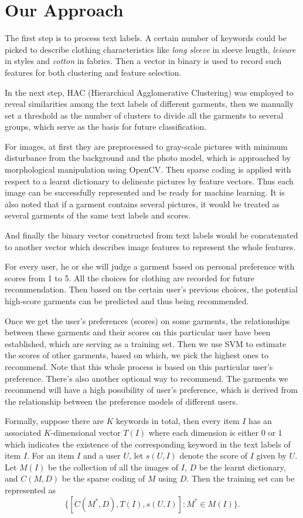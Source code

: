 \section{Our Approach}\label{sec:approach}

The first step is to process text labels. A certain number of keywords 
  could be picked to describe clothing characteristics like 
  \emph{long sleeve} in sleeve length, 
  \emph{leisure} in styles and 
  \emph{cotton} in fabrics. 
Then a vector in binary is used to record such features for both clustering and feature selection.

In the next step, HAC (Hierarchical Agglomerative Clustering) was 
employed to reveal similarities among the text labels of different 
garments, then we manually set a threshold as the number of clusters to divide all the garments to several groups, which serve as the basis for future classification.

For images, at first they are preprocessed to gray-scale 
  pictures with minimum disturbance from the background 
  and the photo model, which is approached by morphological 
  manipulation using OpenCV. 
Then sparse coding is applied with respect to a learnt dictionary  
  to delineate pictures by feature vectors. 
Thus each image can be successfully represented and be ready for machine learning. 
It is also noted that if a garment contains several pictures, 
  it would be treated as several garments of the same text labels and scores.

And finally the binary vector constructed from text labels would be concatenated to another vector which describes image features to represent the whole features.

For every user, he or she will judge a garment based on personal 
  preference with scores from 1 to 5. 
All the choices for clothing are recorded for future recommendation. 
Then based on the certain user's previous choices, the potential 
  high-score garments can be predicted and thus being recommended.

Once we get the user's preferences (scores) on some garments, 
  the relationships between these garments and their scores on this
  particular user have been established, which are serving as a training set. 
Then we use SVM to estimate the scores of other garments, based on which, 
  we pick the highest ones to recommend. 
Note that this whole process is based on this particular user's preference.
There's also another optional way to recommend. 
The garments we recommend will have a high possibility of user's preference, 
  which is derived from the relationship between the preference models of different users.

Formally, suppose there are $K$ keywords in total, then every item $I$ has an associated 
  $K$-dimensional vector $T(I)$ where each dimension is either 0 or 1 which indicates the 
  existence of the corresponding keyword in the text labels of item $I$.
For an item $I$ and a user $U$, let $s(U,I)$ denote the score of $I$ given by $U$. 
Let $M(I)$ be the collection of all the images of $I$, $D$ be the learnt dictionary, and
  $C(M,D)$ be the sparse coding of $M$ using $D$.
Then the training set can be represented as $$ \{ [C(M^*,D), T(I), s(U,I)] : M^* \in M(I) \} .$$

